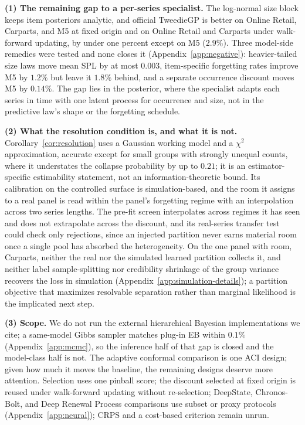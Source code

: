 \documentclass[twoside]{article}
\theoremstyle{definition}
\begin{document}
\textbf{(1) The remaining gap to a per-series specialist.} The
log-normal size block keeps item posteriors analytic, and official
TweedieGP is better on Online Retail, Carparts, and M5 at fixed origin
and on Online Retail and Carparts under walk-forward updating, by under
one percent except on M5 ($2.9\%$). Three model-side remedies were tested
and none closes it (Appendix~\ref{app:negative}): heavier-tailed size
laws move mean SPL by at most $0.003$, item-specific forgetting rates
improve M5 by $1.2\%$ but leave it $1.8\%$ behind, and a separate
occurrence discount moves M5 by $0.14\%$. The gap lies in the posterior,
where the specialist adapts each series in time with one latent process
for occurrence and size, not in the predictive law's shape or the
forgetting schedule.

\textbf{(2) What the resolution condition is, and what it is not.}
Corollary~\ref{cor:resolution} uses a Gaussian working model and a
$\chi^2$ approximation, accurate except for small groups with strongly
unequal counts, where it understates the collapse probability by up to
$0.21$; it is an estimator-specific estimability statement, not an
information-theoretic bound. Its calibration on the controlled surface
is simulation-based, and the room it assigns to a real panel is read
within the panel's forgetting regime with an interpolation across two
series lengths. The pre-fit screen interpolates across regimes it has
seen and does not extrapolate across the discount, and its real-series
transfer test could check only rejections, since an injected partition
never earns material room once a single pool has absorbed the
heterogeneity. On the one panel with room, Carparts, neither the real
nor the simulated learned partition collects it, and neither label
sample-splitting nor credibility shrinkage of the group variance recovers
the loss in simulation (Appendix~\ref{app:simulation-details}); a
partition objective that maximizes resolvable separation rather than
marginal likelihood is the implicated next step.

\textbf{(3) Scope.} We do not run the external hierarchical Bayesian
implementations we cite; a same-model Gibbs sampler matches plug-in EB
within $0.1\%$ (Appendix~\ref{app:mcmc}), so the inference half of that
gap is closed and the model-class half is not. The adaptive conformal
comparison is one ACI design; given how much it moves the baseline, the
remaining designs deserve more attention. Selection uses one pinball
score; the discount selected at fixed origin is reused under walk-forward
updating without re-selection; DeepState, Chronos-Bolt, and Deep Renewal
Process comparisons use subset or proxy protocols
(Appendix~\ref{app:neural}); CRPS and a cost-based criterion remain
unrun.
\end{document}
